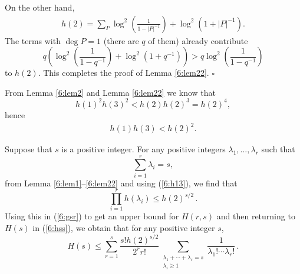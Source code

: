 \documentclass[12pt]{amsart}
\theoremstyle{plain}
\begin{document}
On the other hand,
\begin{eqnarray} \label{6:h2} h(2)=\sum_{P}\log^2\left(\frac{1}{1-|P|^{-1}}\right)+
\log^2\left(1+|P|^{-1}\right).\end{eqnarray}
The terms with $\deg P=1$ (there are $q$ of them) already contribute
\[q \left(\log^2\left(\frac{1}{1-q^{-1}}\right)+
\log^2\left(1+q^{-1}\right)\right)>q\log^2\left(\frac{1}{1-q^{-1}}\right)\]
to $h(2)$. This completes the proof of Lemma \ref{6:lem22}. \quad $\square$

From Lemma \ref{6:lem2} and Lemma \ref{6:lem22} we know that
\[h(1)^2h(3)^2<h(2)h(2)^3=h(2)^4,\]
hence
\begin{eqnarray} \label{6:h13} h(1)h(3) <h(2)^2.\end{eqnarray}

Suppose that $s$ is a positive integer. For any positive integers $\lambda_1,\ldots,\lambda_r$ such that
\[\sum_{i=1}^r \lambda_i=s,\]
from Lemma \ref{6:lem1}--\ref{6:lem22} and using (\ref{6:h13}), we find that
\[\prod_{i=1}^r h(\lambda_i) \le h(2)^{s/2}\,.\]
Using this in (\ref{6:gsr}) to get an upper bound for $H(r,s)$ and then returning to $H(s)$ in (\ref{6:hss}), we obtain that for any positive integer $s$,
\[H(s) \le \sum_{r=1}^s \frac{s!h(2)^{s/2}}{2^r r!}\sum_{\substack{\lambda_1+\cdots+\lambda_r=s\\ \lambda_i \ge 1}} \frac{1}{\lambda_1! \cdots \lambda_r!}\,.\]
\end{document}
